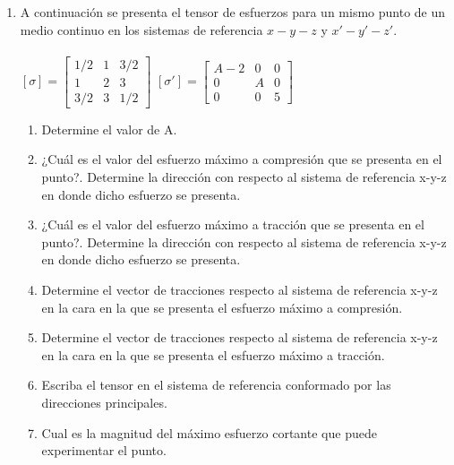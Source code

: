 \documentclass[../notas medios.tex]{subfiles}
\begin{document}
\begin{enumerate}
Se pide:
	\begin{enumerate}
		\item Determinar el valor de la componente $\sigma_{22}$ del tensor de tensiones para que exista al menos un plano que pase por $P$ que est\'e libre de tensiones.
		\item Determinar el vector normal a dicho plano.
		\item Determinar los esfuerzos axiales máximos correspondientes al estado de tensiones presentado.
		\item Determinar las direcciones principales del tensor de esfuerzo.
		\item Determinar la matriz de transformación entre el sistema de referencia $x1-x2-x3$ y el que es colineal con las direcciones pricipales.
		\item Determinar el máximo valor del esfuerzo cortante.
	\end{enumerate}
	
\item  \label{punto26}  A continuación se presenta el tensor de esfuerzos
para un mismo punto de un medio continuo en los sistemas de referencia $x-y-z$ y $x'-y'-z'$.\\
	\\
	$[\sigma] = \left[ \begin{array}{ccc}
	1/2 & 1 & 3/2 \\ 
	1 & 2 & 3 \\
	3/2 & 3 & 1/2
	\end{array}  \right] $
	\hspace{30mm}
	$[\sigma'] = \left[ \begin{array}{ccc}
	A-2 & 0 & 0 \\ 
	0 & A & 0 \\
	0 & 0 & 5
	\end{array}  \right] $
	\begin{enumerate}
		\item Determine el valor de A.
		\item ¿Cuál es el valor del esfuerzo máximo a compresión que se presenta en el punto?. Determine la dirección con respecto al sistema de referencia x-y-z en donde dicho esfuerzo se presenta. 
		\item ¿Cuál es el valor del esfuerzo máximo a tracción que se presenta en el punto?. Determine la dirección con respecto al sistema de referencia x-y-z en donde dicho esfuerzo se presenta. 
		\item Determine el vector de tracciones respecto al sistema de referencia x-y-z en la cara en la que se presenta el esfuerzo máximo a compresión.
		\item Determine el vector de tracciones respecto al sistema de referencia x-y-z en la cara en la que se presenta el esfuerzo m\'aximo a tracción.
		\item Escriba el tensor en el sistema de referencia conformado por las direcciones principales.
		\item Cual es la magnitud del máximo esfuerzo cortante que puede experimentar el punto.  \\
	\end{enumerate}
\end{enumerate}
\end{document}

